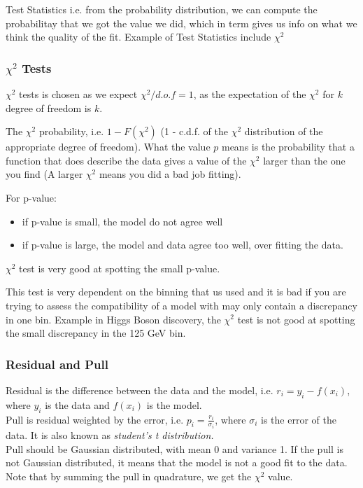 \documentclass[12pt,a4paper]{article}
\begin{document}
\begin{definition}
    {Test Statistics}
    {}
    {i.e. from the probability distribution, we can compute the probabilitay that we got the value we did, which in term gives us info on what we think the quality of the fit. Example of Test Statistics include $\chi^2$}
\end{definition}

\subsubsection{$\chi^2$ Tests}
$\chi^2$ tests is chosen as we expect $\chi^2/d.o.f = 1$, as the expectation of the $\chi^2$ for $k$ degree of freedom is $k$. 

The $\chi^2$ probability, i.e. $1 - F(\chi^2)$ (1 - c.d.f. of the $\chi^2$ distribution of the appropriate degree of freedom). What the value $p$ means is the probability that a function that does describe the data gives a value of the $\chi^2$ larger than the one you find (A larger $\chi^2$ means you did a bad job fitting).

For p-value:
\begin{itemize}
    \item if p-value is small, the model do not agree well
    \item if p-value is large, the model and data agree too well, over fitting the data.
\end{itemize}

$\chi^2$ test is very good at spotting the small p-value.


This test is very dependent on the binning that us used and it is bad if you are trying to assess the compatibility of a model with may only contain a discrepancy in one bin. Example in Higgs Boson discovery, the $\chi^2$ test is not good at spotting the small discrepancy in the 125 GeV bin.

\subsubsection{Residual and Pull}
Residual is the difference between the data and the model, i.e. $r_i = y_i - f(x_i)$, where $y_i$ is the data and $f(x_i)$ is the model.\\
Pull is residual weighted by the error, i.e. $p_i = \frac{r_i}{\sigma_i}$, where $\sigma_i$ is the error of the data. It is also known as\textit{ student's t distribution.}\\
Pull should be Gaussian distributed, with mean 0 and variance 1. If the pull is not Gaussian distributed, it means that the model is not a good fit to the data.\\
Note that by summing the pull in quadrature, we get the $\chi^2$ value.
\end{document}
